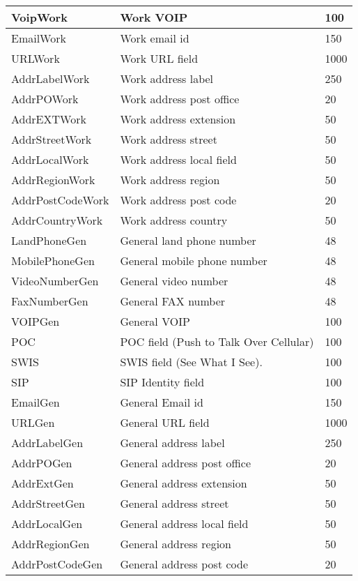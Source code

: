 \begin{table}[htbp]
\begin{center}
\begin{tabular}{l|l|l}
\hline
VoipWork & Work VOIP & 100  \\
\hline
EmailWork & Work email id & 150  \\
\hline
URLWork & Work URL field & 1000  \\
\hline
AddrLabelWork & Work address label & 250  \\
\hline
AddrPOWork & Work address post office & 20  \\
\hline
AddrEXTWork & Work address extension & 50  \\
\hline
AddrStreetWork & Work address street & 50  \\
\hline
AddrLocalWork & Work address local field & 50  \\
\hline
AddrRegionWork & Work address region & 50  \\
\hline
AddrPostCodeWork & Work address post code & 20  \\
\hline
AddrCountryWork & Work address country & 50  \\
\hline
LandPhoneGen & General land phone number & 48  \\
\hline
{\color{red}MobilePhoneGen} & General mobile phone number & 48  \\
\hline
VideoNumberGen & General video number & 48  \\
\hline
FaxNumberGen & General FAX number & 48  \\
\hline
VOIPGen & General VOIP & 100  \\
\hline
POC & POC field (Push to Talk Over Cellular) & 100  \\
\hline
{\color{green}SWIS} & {\color{green}SWIS field (See What I See).} & 100  \\
\hline
SIP & SIP Identity field & 100  \\
\hline
EmailGen & General Email id & 150  \\
\hline
URLGen & General URL field & 1000  \\
\hline
AddrLabelGen & General address label & 250  \\
\hline
AddrPOGen & General address post office & 20  \\
\hline
AddrExtGen & General address extension & 50  \\
\hline
AddrStreetGen & General address street & 50  \\
\hline
AddrLocalGen & General address local field & 50  \\
\hline
AddrRegionGen & General address region & 50  \\
\hline
AddrPostCodeGen & General address post code & 20  \\

\end{tabular}
\end{center}
\end{table}
